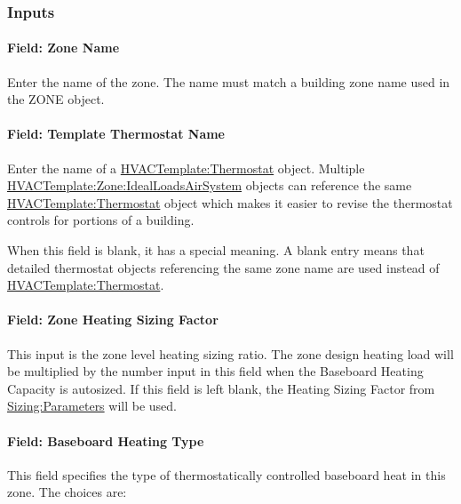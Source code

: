 \subsubsection{Inputs}\label{inputs-2-020}

\paragraph{Field: Zone Name}\label{field-zone-name-1-004}

Enter the name of the zone. The name must match a building zone name used in the ZONE object.

\paragraph{Field: Template Thermostat Name}\label{field-template-thermostat-name-1}

Enter the name of a \hyperref[hvactemplatethermostat]{HVACTemplate:Thermostat} object. Multiple \hyperref[hvactemplatezoneidealloadsairsystem]{HVACTemplate:Zone:IdealLoadsAirSystem} objects can reference the same \hyperref[hvactemplatethermostat]{HVACTemplate:Thermostat} object which makes it easier to revise the thermostat controls for portions of a building.

When this field is blank, it has a special meaning. A blank entry means that detailed thermostat objects referencing the same zone name are used instead of \hyperref[hvactemplatethermostat]{HVACTemplate:Thermostat}.

\paragraph{Field: Zone Heating Sizing Factor}\label{field-zone-heating-sizing-factor-000}

This input is the zone level heating sizing ratio. The zone design heating load will be multiplied by the number input in this field when the Baseboard Heating Capacity is autosized. If this field is left blank, the Heating Sizing Factor from \hyperref[sizingparameters]{Sizing:Parameters} will be used.

\paragraph{Field: Baseboard Heating Type}\label{field-baseboard-heating-type}

This field specifies the type of thermostatically controlled baseboard heat in this zone. The choices are:

